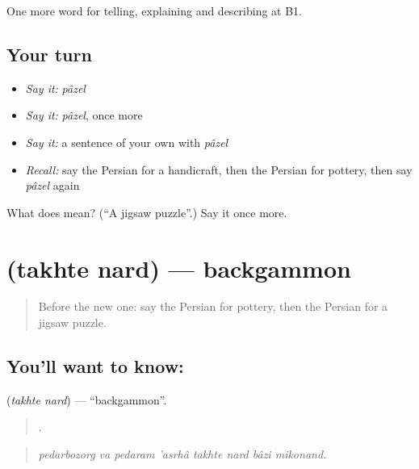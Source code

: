 \begin{grammarlens}[title={What you've built}]
One more word for telling, explaining and describing at B1.
\end{grammarlens}

\subsection*{Your turn}
\begin{itemize}
\raggedright
  \item \emph{Say it:} \emph{pâzel}
  \item \emph{Say it:} \emph{pâzel}, once more
  \item \emph{Say it:} a sentence of your own with \emph{pâzel}
  \item \emph{Recall:} say the Persian for a handicraft, then the Persian for pottery, then say \emph{pâzel} again
\end{itemize}

\begin{tcolorbox}[breakable,colback=teal!4,colframe=teal!35!black,title={Before you move on}]
What does  mean? (\textquotedblleft{}A jigsaw puzzle\textquotedblright{}.) Say it once more.
\end{tcolorbox}
\section[\texorpdfstring{\fa{تخته} \fa{نرد} (takhte nard)}{تخته نرد (takhte nard)}]{  (takhte nard) — backgammon}

\label{lesson:FA-C509-takhte-nard}



\begin{quote}
Before the new one: say the Persian for pottery, then the Persian for a jigsaw puzzle.
\end{quote}

\subsection*{You'll want to know:  }
\textbf{ } (\emph{takhte nard}) — \textquotedblleft{}backgammon\textquotedblright{}.

\begin{quote}
       .
\end{quote}

\begin{quote}
\emph{pedarbozorg va pedaram 'asrhâ takhte nard bâzi mikonand.}
\end{quote}


